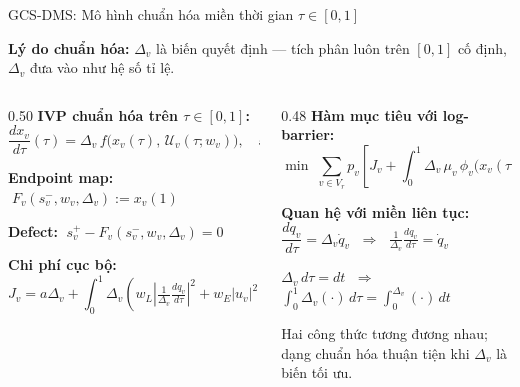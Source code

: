 \documentclass[aspectratio=169]{beamer}
\begin{document}
\begin{frame}{GCS-DMS: Mô hình chuẩn hóa miền thời gian $\tau\in[0,1]$}
    \small

    \textbf{Lý do chuẩn hóa:} $\Delta_v$ là biến quyết định — tích phân luôn trên $[0,1]$
    cố định, $\Delta_v$ đưa vào như hệ số tỉ lệ.

    \vspace{0.4em}

    \begin{columns}[T, onlytextwidth]
        \begin{column}{0.50\textwidth}
            \textbf{IVP chuẩn hóa trên $\tau\in[0,1]$:}
            \[
                \frac{dx_v}{d\tau}(\tau)
                = \Delta_v\,f\!\bigl(x_v(\tau),\,\mathcal{U}_v(\tau;w_v)\bigr),
                \quad x_v(0)=s_v^-
            \]

            \textbf{Endpoint map:}
            $\;F_v(s_v^-,w_v,\Delta_v):=x_v(1)$

            \vspace{0.3em}
            \textbf{Defect:}
            $\;s_v^+ - F_v(s_v^-,w_v,\Delta_v)=0$

            \vspace{0.3em}
            \textbf{Chi phí cục bộ:}
            \[
                J_v = a\Delta_v
                +\int_0^1\!\Delta_v\!\left(
                w_L\!\left|\tfrac{1}{\Delta_v}\tfrac{dq_v}{d\tau}\right|^2
                +w_E|u_v|^2
                \right)\!d\tau
            \]
        \end{column}

        \begin{column}{0.48\textwidth}
            \textbf{Hàm mục tiêu với log-barrier:}
            \[
                \min\;\sum_{v\in V_r} p_v\!\left[
                    J_v
                    +\int_0^1\!\Delta_v\,\mu_v\,\phi_v\!\bigl(x_v(\tau)\bigr)\,d\tau
                    \right]
            \]

            \textbf{Quan hệ với miền liên tục:}\\
            $\dfrac{dq_v}{d\tau}=\Delta_v\dot{q}_v$
            $\;\Rightarrow\;$
            $\tfrac{1}{\Delta_v}\tfrac{dq_v}{d\tau}=\dot{q}_v$

            $\Delta_v\,d\tau = dt$
            $\;\Rightarrow\;$
            $\int_0^1\Delta_v(\cdot)\,d\tau = \int_0^{\Delta_v}(\cdot)\,dt$

            \vspace{0.3em}
            Hai công thức tương đương nhau;\\
            dạng chuẩn hóa thuận tiện khi $\Delta_v$ là biến tối ưu.
        \end{column}
    \end{columns}

\end{frame}
\end{document}
